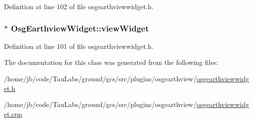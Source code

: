 \-Definition at line 102 of file osgearthviewwidget.\-h.

\hypertarget{class_osg_earthview_widget_a2a1b22b5eafba67d10492824bdd9bdb8}{
\subsubsection[{view\-Widget}]{$\ast$ {\bf \-Osg\-Earthview\-Widget\-::view\-Widget}}}\label{class_osg_earthview_widget_a2a1b22b5eafba67d10492824bdd9bdb8}


\-Definition at line 101 of file osgearthviewwidget.\-h.



\-The documentation for this class was generated from the following files\-:\begin{DoxyCompactItemize}
\item 
/home/jb/code/\-Tau\-Labs/ground/gcs/src/plugins/osgearthview/\hyperlink{osgearthviewwidget_8h}{osgearthviewwidget.\-h}\item 
/home/jb/code/\-Tau\-Labs/ground/gcs/src/plugins/osgearthview/\hyperlink{osgearthviewwidget_8cpp}{osgearthviewwidget.\-cpp}\end{DoxyCompactItemize}
